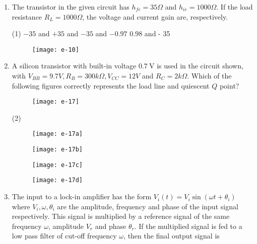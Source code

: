 \begin{enumerate}
	\item The transistor in the given circuit has $h_{f e}=35 \Omega$ and $h_{i e}=1000 \Omega$. If the load resistance $R_{L}=1000 \Omega$, the voltage and current gain are, respectively.
	{	}
	\begin{tasks}(1)
		\task[\textbf{A.}] $-35$ and $+35$
		 and $-35$
		 and $-0.97$
		\task[\textbf{D.}]  $0.98$ and - 35
	\end{tasks}
	\begin{figure}[H]
		\centering
		\texttt{[image: e-10]}
	\end{figure}
	\item A silicon transistor with built-in voltage $0.7 \mathrm{~V}$ is used in the circuit shown, with $V_{B B}=9.7 V, R_{B}=300 k \Omega, V_{C C}=12 V$ and $R_{C}=2 k \Omega$. Which of the following figures correctly represents the load line and quiescent $Q$ point?
	{	}
	\begin{figure}[H]
		\centering
		\texttt{[image: e-17]}
	\end{figure}
	\begin{tasks}(2)
		\task[\textbf{A.}] \begin{figure}[H]
			\centering
			\texttt{[image: e-17a]}
		\end{figure}
		\task[\textbf{B.}] \begin{figure}[H]
			\centering
			\texttt{[image: e-17b]}
		\end{figure}
		\task[\textbf{C.}] \begin{figure}[H]
			\centering
			\texttt{[image: e-17c]}
		\end{figure}
		\task[\textbf{D.}] \begin{figure}[H]
			\centering
			\texttt{[image: e-17d]}
		\end{figure}
	\end{tasks}
	\item The input to a lock-in amplifier has the form $V_{i}(t)=V_{i} \sin \left(\omega t+\theta_{i}\right)$ where $V_{i}, \omega, \theta_{i}$ are the amplitude, frequency and phase of the input signal respectively. This signal is multiplied by a reference signal of the same frequency $\omega$, amplitude $V_{r}$ and phase $\theta_{r}$. If the multiplied signal is fed to a low pass filter of cut-off frequency $\omega$, then the final output signal is

\end{enumerate}
